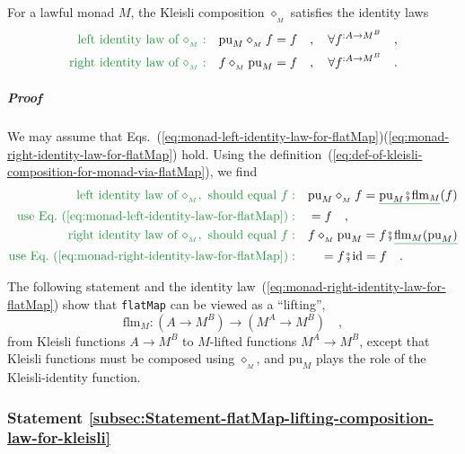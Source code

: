 For a lawful monad $M$, the Kleisli composition $\diamond_{_{M}}$
satisfies the identity laws
\begin{align}
{\color{greenunder}\text{left identity law of }\diamond_{_{M}}:}\quad & \text{pu}_{M}\diamond_{_{M}}f=f\quad,\quad\forall f^{:A\rightarrow M^{B}}\quad,\label{eq:kleisli-left-identity-law}\\
{\color{greenunder}\text{right identity law of }\diamond_{_{M}}:}\quad & f\diamond_{_{M}}\text{pu}_{M}=f\quad,\quad\forall f^{:A\rightarrow M^{B}}\quad.\label{eq:kleisli-right-identity-law}
\end{align}


\subparagraph{Proof}

We may assume that Eqs.~(\ref{eq:monad-left-identity-law-for-flatMap})\textendash (\ref{eq:monad-right-identity-law-for-flatMap})
hold. Using the definition~(\ref{eq:def-of-kleisli-composition-for-monad-via-flatMap}),
we find
\begin{align*}
{\color{greenunder}\text{left identity law of }\diamond_{_{M}},\text{ should equal }f:}\quad & \text{pu}_{M}\diamond_{_{M}}f=\gunderline{\text{pu}_{M}\bef\text{flm}_{M}}(f)\\
{\color{greenunder}\text{use Eq.~(\ref{eq:monad-left-identity-law-for-flatMap})}:}\quad & =f\quad,\\
{\color{greenunder}\text{right identity law of }\diamond_{_{M}},\text{ should equal }f:}\quad & f\diamond_{_{M}}\text{pu}_{M}=f\bef\gunderline{\text{flm}_{M}(\text{pu}_{M})}\\
{\color{greenunder}\text{use Eq.~(\ref{eq:monad-right-identity-law-for-flatMap})}:}\quad & \quad=f\bef\text{id}=f\quad.
\end{align*}

The following statement and the identity law~(\ref{eq:monad-right-identity-law-for-flatMap})
show that \lstinline!flatMap! can be viewed as a \textsf{``}lifting\textsf{''},
\[
\text{flm}_{M}:(A\rightarrow M^{B})\rightarrow(M^{A}\rightarrow M^{B})\quad,
\]
from Kleisli functions $A\rightarrow M^{B}$ to $M$-lifted functions
$M^{A}\rightarrow M^{B}$, except that Kleisli functions must be composed
using $\diamond_{_{M}}$, and $\text{pu}_{M}$ plays the role of the
Kleisli-identity function.

\subsubsection{Statement \label{subsec:Statement-flatMap-lifting-composition-law-for-kleisli}\ref{subsec:Statement-flatMap-lifting-composition-law-for-kleisli}}

